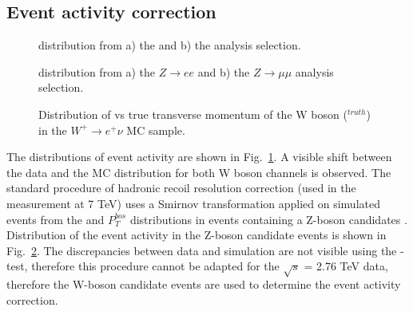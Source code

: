 \subsection{Event activity correction}\label{sec:SumetCor}



\begin{figure}[!tbp]
\begin{minipage}[h]{0.49\linewidth}
\end{minipage}
\hfill
\begin{minipage}[h]{0.49\linewidth}
\end{minipage}
\caption{\sumet distribution from a) the \wenu and b) the \wmunu analysis selection.}
\label{HadrRecoil:UncorrSumet}
\end{figure}

\begin{figure}[!tbp]
\begin{minipage}[h]{0.49\linewidth}
\end{minipage}
\hfill
\begin{minipage}[h]{0.49\linewidth}
\end{minipage}
\caption{\sumet distribution from a) the $Z\to ee$  and b) the $Z\to \mu\mu$ analysis selection.}
\label{HadronRecoilSumetZ}
\end{figure}

\begin{figure}[!tb]
\caption{Distribution of \sumet vs true transverse momentum of the W boson (\ptw$^{truth}$) in the $W^{+} \to e^{+}\nu$ MC sample.  }
\label{HadrRecoil:SumetPt}
\end{figure}




The distributions of event activity are shown in Fig.~\ref{HadrRecoil:UncorrSumet}. A visible shift between the data and the MC distribution for both W boson channels is observed. The standard procedure of hadronic recoil resolution correction (used in the \mtw measurement at 7 TeV) uses a Smirnov transformation applied on simulated events from the \sumet and $P_{T}^{bos}$ distributions in events containing a Z-boson candidates \cite{HRCorrections}. Distribution of the event activity in the Z-boson candidate events is shown in Fig.~\ref{HadronRecoilSumetZ}. The discrepancies between data and simulation are not visible using the \chiD-test, therefore this procedure cannot be adapted for the $\sqrt{s}$ = 2.76 TeV data, therefore the W-boson candidate events are used to determine the event activity correction.

